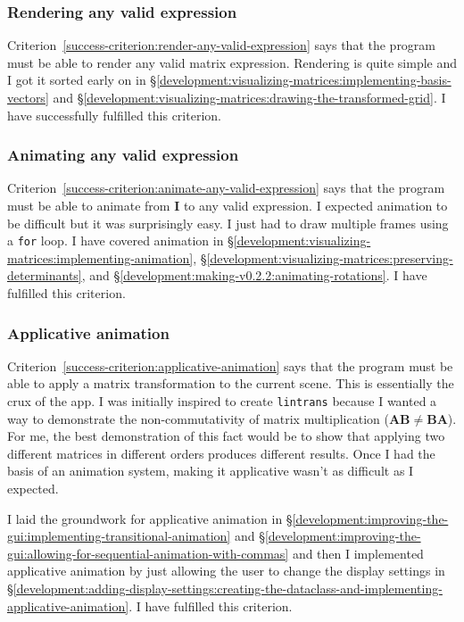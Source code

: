 \documentclass[../main.tex]{subfiles}
\begin{document}
\subsubsection{Rendering any valid expression\label{evaluation:evaluating-success-criteria:render-any-valid-expression}}

Criterion~\ref{success-criterion:render-any-valid-expression} says that the program must be able to render any valid matrix expression. Rendering is quite simple and I got it sorted early on in \S\ref{development:visualizing-matrices:implementing-basis-vectors} and \S\ref{development:visualizing-matrices:drawing-the-transformed-grid}. I have successfully fulfilled this criterion.

\subsubsection{Animating any valid expression\label{evaluation:evaluating-success-criteria:animate-any-valid-expression}}

Criterion~\ref{success-criterion:animate-any-valid-expression} says that the program must be able to animate from $\mathbf{I}$ to any valid expression. I expected animation to be difficult but it was surprisingly easy. I just had to draw multiple frames using a \texttt{for} loop. I have covered animation in \S\ref{development:visualizing-matrices:implementing-animation}, \S\ref{development:visualizing-matrices:preserving-determinants}, and \S\ref{development:making-v0.2.2:animating-rotations}. I have fulfilled this criterion.

\subsubsection{Applicative animation\label{evaluation:evaluating-success-criteria:applicative-animation}}

Criterion~\ref{success-criterion:applicative-animation} says that the program must be able to apply a matrix transformation to the current scene. This is essentially the crux of the app. I was initially inspired to create \texttt{lintrans} because I wanted a way to demonstrate the non-commutativity of matrix multiplication ($\mathbf{AB} \ne \mathbf{BA}$). For me, the best demonstration of this fact would be to show that applying two different matrices in different orders produces different results. Once I had the basis of an animation system, making it applicative wasn't as difficult as I expected.

I laid the groundwork for applicative animation in \S\ref{development:improving-the-gui:implementing-transitional-animation} and \S\ref{development:improving-the-gui:allowing-for-sequential-animation-with-commas} and then I implemented applicative animation by just allowing the user to change the display settings in \S\ref{development:adding-display-settings:creating-the-dataclass-and-implementing-applicative-animation}. I have fulfilled this criterion.
\end{document}
